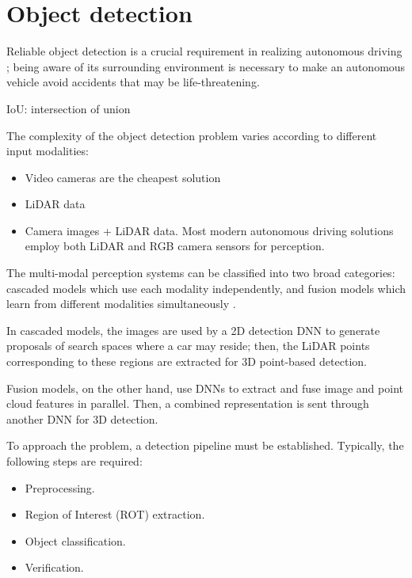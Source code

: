 \section{Object detection}
Reliable object detection is a crucial requirement in realizing autonomous driving \cite{DBLP:journals/ftcgv/JanaiGBG20}; being aware of its surrounding environment is necessary to make an autonomous vehicle avoid accidents that may be life-threatening.

IoU: intersection of union

The complexity of the object detection problem varies according to different input modalities:
\begin{itemize}
    \item Video cameras are the cheapest solution
    \item LiDAR data 
    \item Camera images + LiDAR data. Most modern autonomous driving solutions employ both LiDAR and RGB camera sensors for perception. 
\end{itemize}

The multi-modal perception systems can be classified into two broad categories: cascaded models which use each modality independently, and fusion models which learn from different modalities simultaneously \cite{DBLP:conf/iros/AbdelfattahY0W21}.

In cascaded models, the images are used by a 2D detection DNN to generate proposals of search spaces where a car may reside; then, the LiDAR points corresponding to these regions are extracted for 3D point-based detection.

Fusion models, on the other hand, use DNNs to extract and fuse image and point cloud features in parallel. Then, a combined
representation is sent through another DNN for 3D detection.


To approach the problem, a detection pipeline must be established. Typically, the following steps are required:
\begin{itemize}
    \item Preprocessing.
    \item Region of Interest (ROT) extraction.
    \item Object classification.
    \item Verification.
\end{itemize}


